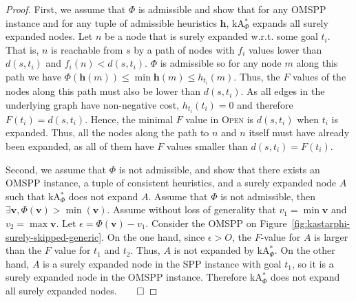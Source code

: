 \documentclass[smallextended]{svjour3}       %
\newcommand{\omspp}{\ac{OMSPP}\xspace}
\newcommand{\spp}{\ac{SPP}\xspace}
\newcommand{\kastarphi}{\textup{kA}$^*_{\Phi}$\xspace}
\newcommand{\open}{\textsc{Open}\xspace}
\newcommand{\axiomadm}{admissible\xspace}
\newcommand{\vect}[1]{\mathbf{#1}}
\begin{document}
\admissiblesurely*
\begin{proof}
First, we assume that $\Phi$ is \axiomadm and show that for any \omspp instance and for any tuple of admissible heuristics $\vect{h}$, \kastarphi expands all surely expanded nodes.
Let $n$ be a node that is surely expanded w.r.t. some goal $t_i$.
That is, $n$ is reachable from $s$ by a path of nodes with $f_i$ values lower than $d(s, t_i)$ and $f_i(n) < d(s, t_i)$.
$\Phi$ is \axiomadm so for any node $m$ along this path we have $\Phi(\vect{h}(m)) \leq \min \vect{h}(m) \leq h_{t_i}(m)$.
Thus, the $F$ values of the nodes along this path must also be lower than $d(s, t_i)$.
As all edges in the underlying graph have non-negative cost, $h_{t_i}(t_i) = 0$ and therefore $F(t_i) = d(s, t_i)$.
Hence, the minimal $F$ value in \open is $d(s, t_i)$ when $t_i$ is expanded.
Thus, all the nodes along the path to $n$ and $n$ itself must have already been expanded, as all of them have $F$ values smaller than $d(s, t_i) = F(t_i)$.
	
Second, we assume that $\Phi$ is not \axiomadm, and show that there exists an \omspp instance, a tuple of consistent heuristics, and a surely expanded node $A$ such that \kastarphi does not expand $A$.
Assume that $\Phi$ is not \axiomadm, then $\exists \vect{v}, \Phi(\vect{v}) > \min(\vect{v})$.
Assume without loss of generality that $v_1 = \min \vect{v}$ and $v_2 = \max\vect{v}$.
Let $\epsilon = \Phi(\vect{v}) - v_1$.
Consider the \omspp on Figure~\ref{fig:kastarphi-surely-skipped-generic}.
On the one hand, since $\epsilon > O$, the $F$-value for $A$ is larger than the $F$ value for $t_1$ and $t_2$.
Thus, $A$ is not expanded by \kastarphi.
On the other hand, $A$ is a surely expanded node in the \spp instance with goal $t_1$, so it is a surely expanded node in the \omspp instance.
Therefore \kastarphi does not expand all surely expanded nodes.$\qed$
\end{proof}
\end{document}
